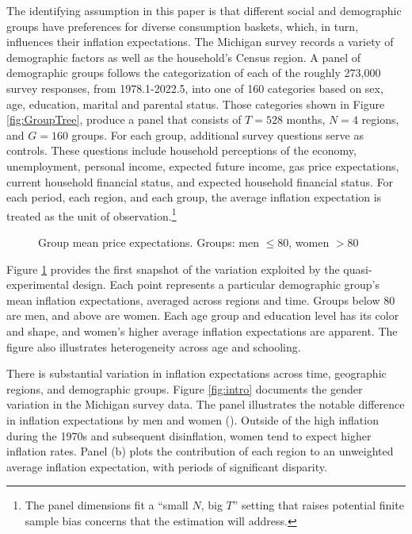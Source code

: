 \documentclass[12pt]{article}
\begin{document}
The identifying assumption in this paper is that different social and demographic groups have preferences for diverse consumption baskets, which, in turn, influences their inflation expectations. The Michigan survey records a variety of demographic factors as well as the household's Census region. A panel of demographic groups follows the categorization of each of the roughly 273,000 survey responses, from 1978.1-2022.5, into one of 160 categories based on sex, age, education, marital and parental status. Those categories shown in Figure \ref{fig:GroupTree}, produce a panel that consists of $T = 528$ months, $N = 4$ regions, and $G=160$ groups. For each group, additional survey questions serve as controls. These questions include household perceptions of the economy, unemployment, personal income, expected future income, gas price expectations, current household financial status, and expected household financial status. For each period, each region, and each group, the average inflation expectation is treated as the unit of observation.\footnote{The panel dimensions fit a ``small $N$, big $T$'' setting that raises potential finite sample bias concerns that the estimation will address.}

\begin{figure}
\centering
\caption{Group mean price expectations. Groups: men $\leq 80$, women $>80$}\label{fig:GroupMeans}

\end{figure}

Figure \ref{fig:GroupMeans} provides the first snapshot of the variation exploited by the quasi-experimental design. Each point represents a particular demographic group's mean inflation expectations, averaged across regions and time. Groups below 80 are men, and above are women. Each age group and education level has its color and shape, and women's higher average inflation expectations are apparent. The figure also illustrates heterogeneity across age and schooling.

There is substantial variation in inflation expectations across time, geographic regions, and demographic groups. Figure \ref{fig:intro} documents the gender variation in the Michigan survey data. The panel illustrates the notable difference in inflation expectations by men and women (\cite{BryanVenkatu}). Outside of the high inflation during the 1970s and subsequent disinflation, women tend to expect higher inflation rates. Panel (b) plots the contribution of each region to an unweighted average inflation expectation, with periods of significant disparity.  
\end{document}
